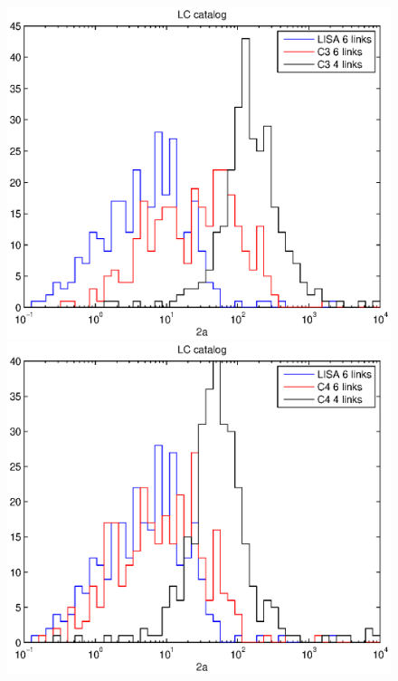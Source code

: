 \documentclass{iopart}
\begin{document}
\begin{figure}[H]
\includegraphics[scale=0.54]{FigSMBHRyanNeil/LC2a3.eps}
\includegraphics[scale=0.54]{FigSMBHRyanNeil/LC2a4.eps}

\end{figure}
\end{document}
